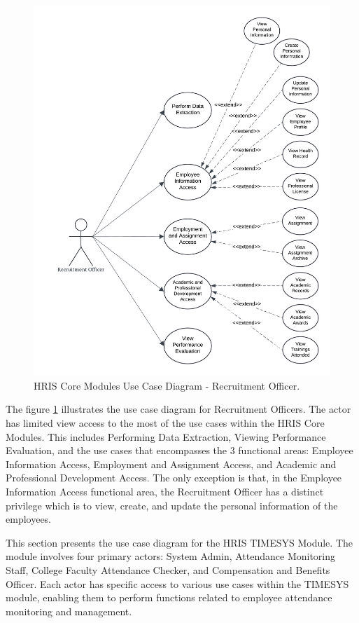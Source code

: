     \begin{figure}[H]
        \centering
        \includegraphics[width=0.9\linewidth]{figures/images/diagrams/usecase/use-case-basic-8.png}
        \caption{HRIS Core Modules Use Case Diagram - Recruitment Officer.}
        \label{fig:use-case-basic-8}
    \end{figure}

    The figure \ref{fig:use-case-basic-8} illustrates the use case diagram for Recruitment Officers. The actor has limited view access to the most of the use cases within the HRIS Core Modules. This includes Performing Data Extraction, Viewing Performance Evaluation, and the use cases that  encompasses the 3 functional areas: Employee Information Access, Employment and Assignment Access, and Academic and Professional Development Access. The only exception is that,  in the Employee Information Access functional area, the Recruitment Officer has a distinct privilege which is to view, create, and update the personal information of the employees.


    This section presents the use case diagram for the HRIS TIMESYS Module. The module involves four primary actors: System Admin, Attendance Monitoring Staff, College Faculty Attendance Checker, and Compensation and Benefits Officer. Each actor has specific access to various use cases within the TIMESYS module, enabling them to perform functions related to employee attendance monitoring and management.

